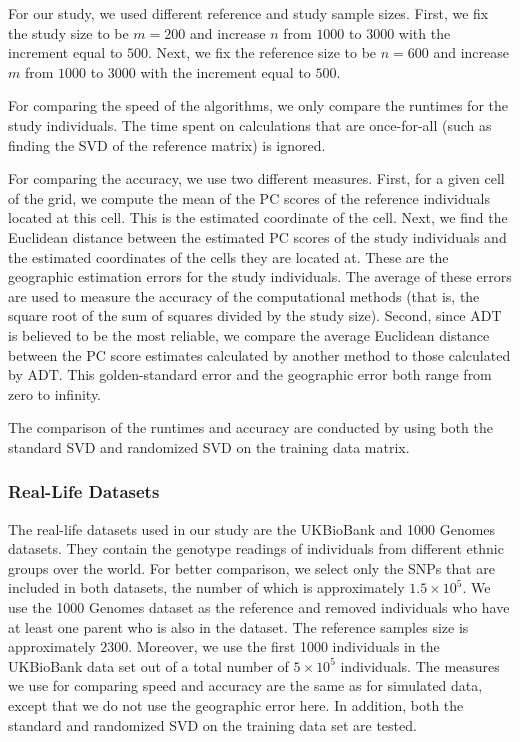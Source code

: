 \documentclass{article}
\begin{document}
For our study, we used different reference and study sample sizes.
First, we fix
the study size to be $m=200$ and increase $n$ from $1000$ to $3000$ with the
increment equal to $500$.
Next, we fix
the reference size to be $n=600$ and increase $m$ from $1000$ to $3000$ with the increment equal to $500$.

For comparing the speed of the algorithms,
we only compare the runtimes for the study individuals.
The time spent on calculations that are once-for-all (such as finding the SVD of
the reference matrix) is ignored.

For comparing the accuracy, we use two different measures.
First, for a given cell of the grid, we compute the mean of the PC scores of the 
reference individuals located at this cell.  
This is the estimated coordinate of the cell.
Next, we find the Euclidean distance between the estimated PC scores of the
study individuals and the estimated coordinates of the cells they are located
at.
These are the geographic estimation errors for the study individuals.
The average of these errors are used to measure the accuracy of the
computational methods (that is, the square root of the sum of squares divided by the
study size). 
Second, since ADT is believed to be the most reliable, we compare the average
Euclidean distance between the PC score estimates calculated by another method
to those calculated by ADT. 
This golden-standard error and the geographic error both range from zero to infinity.

The comparison of the runtimes and accuracy are conducted by using both the
standard SVD and randomized SVD on the training data matrix.

\subsubsection{Real-Life Datasets}

The real-life datasets used in our study are the UKBioBank and 1000 Genomes datasets.
They contain the genotype readings of individuals from different ethnic groups over the world.
For better comparison, we select only the SNPs that are included in both datasets,
the number of which is approximately $1.5 \times 10^5$.
We use the 1000 Genomes dataset as the reference and removed individuals who have at least one parent who is also in the dataset.
The reference samples size is approximately $2300$.
Moreover, we use the first 1000 individuals in the UKBioBank data set out of a
total number of $5 \times 10^5$ individuals. 
The measures we use for comparing speed and accuracy are the same as for
simulated data,
except that we do not use the geographic error here.
In addition, both the standard and randomized SVD on the training data set are tested.
\end{document}

